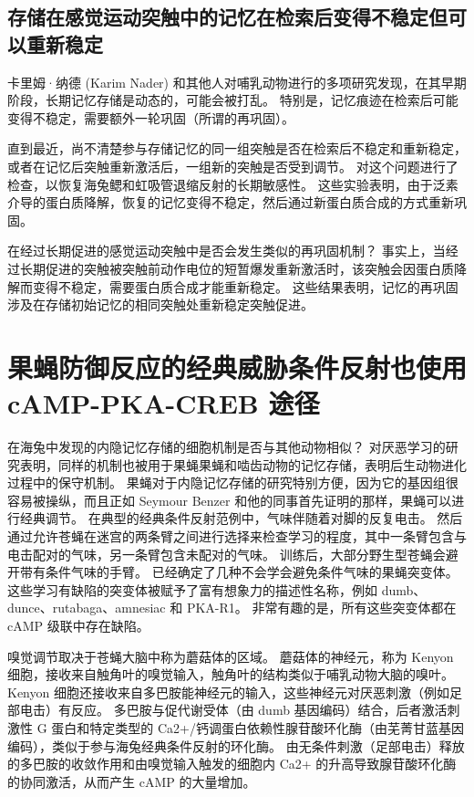 \subsection{存储在感觉运动突触中的记忆在检索后变得不稳定但可以重新稳定}

卡里姆·纳德 (Karim Nader) 和其他人对哺乳动物进行的多项研究发现，在其早期阶段，长期记忆存储是动态的，可能会被打乱。
特别是，记忆痕迹在检索后可能变得不稳定，需要额外一轮巩固（所谓的再巩固）。


直到最近，尚不清楚参与存储记忆的同一组突触是否在检索后不稳定和重新稳定，或者在记忆后突触重新激活后，一组新的突触是否受到调节。
对这个问题进行了检查，以恢复海兔鳃和虹吸管退缩反射的长期敏感性。
这些实验表明，由于泛素介导的蛋白质降解，恢复的记忆变得不稳定，然后通过新蛋白质合成的方式重新巩固。


在经过长期促进的感觉运动突触中是否会发生类似的再巩固机制？
事实上，当经过长期促进的突触被突触前动作电位的短暂爆发重新激活时，该突触会因蛋白质降解而变得不稳定，需要蛋白质合成才能重新稳定。
这些结果表明，记忆的再巩固涉及在存储初始记忆的相同突触处重新稳定突触促进。



\section{果蝇防御反应的经典威胁条件反射也使用 cAMP-PKA-CREB 途径}

在海兔中发现的内隐记忆存储的细胞机制是否与其他动物相似？
对厌恶学习的研究表明，同样的机制也被用于果蝇果蝇和啮齿动物的记忆存储，表明后生动物进化过程中的保守机制。
果蝇对于内隐记忆存储的研究特别方便，因为它的基因组很容易被操纵，而且正如 Seymour Benzer 和他的同事首先证明的那样，果蝇可以进行经典调节。
在典型的经典条件反射范例中，气味伴随着对脚的反复电击。
然后通过允许苍蝇在迷宫的两条臂之间进行选择来检查学习的程度，其中一条臂包含与电击配对的气味，另一条臂包含未配对的气味。
训练后，大部分野生型苍蝇会避开带有条件气味的手臂。
已经确定了几种不会学会避免条件气味的果蝇突变体。
这些学习有缺陷的突变体被赋予了富有想象力的描述性名称，例如 dumb、dunce、rutabaga、amnesiac 和 PKA-R1。
非常有趣的是，所有这些突变体都在 cAMP 级联中存在缺陷。


嗅觉调节取决于苍蝇大脑中称为蘑菇体的区域。
蘑菇体的神经元，称为 Kenyon 细胞，接收来自触角叶的嗅觉输入，触角叶的结构类似于哺乳动物大脑的嗅叶。
Kenyon 细胞还接收来自多巴胺能神经元的输入，这些神经元对厌恶刺激（例如足部电击）有反应。
多巴胺与促代谢受体（由 dumb 基因编码）结合，后者激活刺激性 G 蛋白和特定类型的 Ca2+/钙调蛋白依赖性腺苷酸环化酶（由芜菁甘蓝基因编码），类似于参与海兔经典条件反射的环化酶。
由无条件刺激（足部电击）释放的多巴胺的收敛作用和由嗅觉输入触发的细胞内 Ca2+ 的升高导致腺苷酸环化酶的协同激活，从而产生 cAMP 的大量增加。


